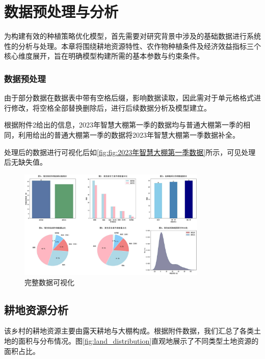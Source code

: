 \section{数据预处理与分析}

为构建有效的种植策略优化模型，首先需要对研究背景中涉及的基础数据进行系统性的分析与处理。本章将围绕耕地资源特性、农作物种植条件及经济效益指标三个核心维度展开，旨在明确模型构建所需的基本参数与约束条件。


\subsubsection{数据预处理}



由于部分数据在数据表中带有空格后缀，影响数据读取，因此需对于单元格格式进行修改，将空格全部替换删除后，进行后续数据分析及模型建立。

根据附件2给出的信息，2023年智慧大棚第一季的数据均与普通大棚第一季的相同，利用给出的普通大棚第一季的数据将2023年智慧大棚第一季数据补全。

处理后的数据进行可视化后如\ref{fig:fig:2023年智慧大棚第一季数据}所示，可见处理后无缺失值。

\begin{figure}[htbp]
    \centering
    \includegraphics[width=0.8\textwidth]{figs/2数据分析与预处理/数据预处理后.jpg}
    \caption{完整数据可视化}
    \label{fig:2023年智慧大棚第一季数据}
\end{figure}

\subsection{耕地资源分析}

该乡村的耕地资源主要由露天耕地与大棚构成。根据附件数据，我们汇总了各类土地的面积与分布情况。图\ref{fig:land_distribution}直观地展示了不同类型土地资源的面积占比。

